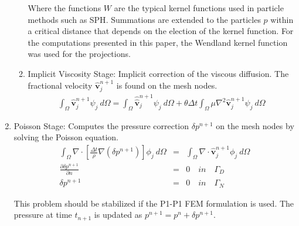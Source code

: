 \begin{enumerate}
\begin{enumerate}
      Where the functions $W$ are the typical kernel functions used in particle methods such as SPH\cite{Mon77}. Summations are extended to the particles $p$ within a critical distance that depends on the election of the kernel function. For the computations presented in this paper, the Wendland kernel function\cite{Wendland} was used for the projections.

    \item Implicit Viscosity Stage: Implicit correction of the viscous diffusion. The fractional velocity $\widehat{\mathbf{v}}^{n+1}_{j}$ is found on the mesh nodes.
      \begin{eqnarray}\label{Step4a}
      \displaystyle \int_{\Omega} \widehat{\mathbf{v}}^{n+1}_{j}\psi_j\ d\Omega =\int_{\Omega} \widehat{\widehat{\mathbf{v}}}^{n+1}_{j}\psi_j\  d\Omega + \theta \Delta t \int_{\Omega} \mu \nabla^{2}\widehat{\mathbf{v}}^{n+1}_{j} \psi_j\ d\Omega
      \end{eqnarray}

  \end{enumerate}
 
  \item Poisson Stage: Computes the pressure correction $\delta p^{n+1}$ on the mesh nodes by solving the Poisson equation.
    \begin{eqnarray}\label{Step5a}
      \int_{\Omega} \nabla \cdot \left[\frac{\Delta t}{\rho}\nabla(\delta p^{n+1})\right] \phi_j\ d\Omega &=& \int_{\Omega} \nabla \cdot \widehat{\mathbf{v}}_j^{n+1} \phi_j\ d\Omega \\
      \frac{\partial \delta p^{n+1}}{\partial n} &=& 0 \quad in \quad \Gamma_D \\
      \delta p^{n+1} &=& 0 \quad in \quad \Gamma_N
    \end{eqnarray}

    This problem should be stabilized if the P1-P1 FEM formulation is used\cite{Idelsohn12b}. The pressure at time $t_{n+1}$ is updated as $p^{n+1}=p^{n}+\delta p^{n+1}$.


\end{enumerate}
